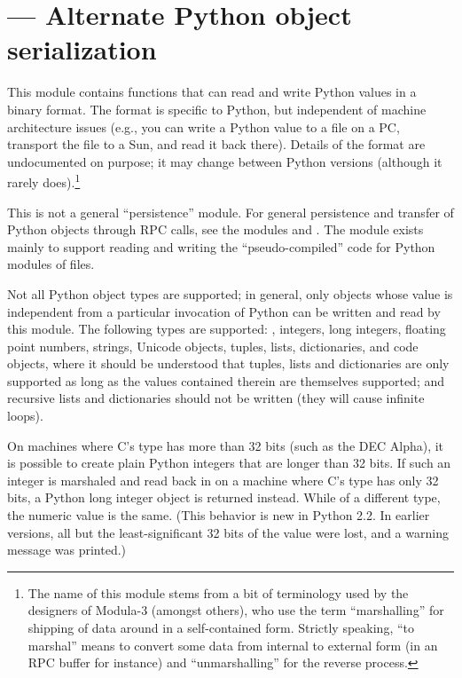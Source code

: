 \section{ ---
         Alternate Python object serialization}



This module contains functions that can read and write Python
values in a binary format.  The format is specific to Python, but
independent of machine architecture issues (e.g., you can write a
Python value to a file on a PC, transport the file to a Sun, and read
it back there).  Details of the format are undocumented on purpose;
it may change between Python versions (although it rarely
does).\footnote{The name of this module stems from a bit of
  terminology used by the designers of Modula-3 (amongst others), who
  use the term ``marshalling'' for shipping of data around in a
  self-contained form. Strictly speaking, ``to marshal'' means to
  convert some data from internal to external form (in an RPC buffer for
  instance) and ``unmarshalling'' for the reverse process.}

This is not a general ``persistence'' module.  For general persistence
and transfer of Python objects through RPC calls, see the modules
 and .  The  module exists
mainly to support reading and writing the ``pseudo-compiled'' code for
Python modules of  files.

Not all Python object types are supported; in general, only objects
whose value is independent from a particular invocation of Python can
be written and read by this module.  The following types are supported:
, integers, long integers, floating point numbers,
strings, Unicode objects, tuples, lists, dictionaries, and code
objects, where it should be understood that tuples, lists and
dictionaries are only supported as long as the values contained
therein are themselves supported; and recursive lists and dictionaries
should not be written (they will cause infinite loops).

 On machines where C's  type has more than
32 bits (such as the DEC Alpha), it is possible to create plain Python
integers that are longer than 32 bits.
If such an integer is marshaled and read back in on a machine where
C's  type has only 32 bits, a Python long integer object
is returned instead.  While of a different type, the numeric value is
the same.  (This behavior is new in Python 2.2.  In earlier versions,
all but the least-significant 32 bits of the value were lost, and a
warning message was printed.)

